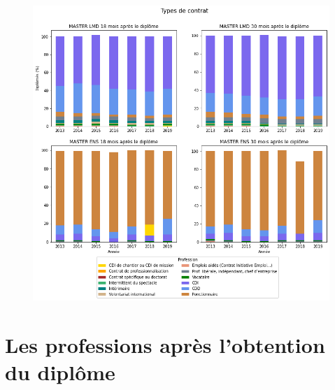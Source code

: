\documentclass[12pt, a4paper, titlepage, table]{article}
\begin{document}
		\begin{figure}[H]
			\centering
			\includegraphics[width=1\textwidth]{../graphs/repartition_contrats_situation_2.png}
			\label{fig:contrat_pourcentage_2}
		\end{figure}

\section{Les professions après l'obtention du diplôme}
\end{document}
